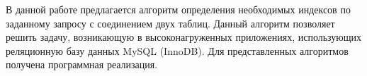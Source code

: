 \Conclusion

В данной работе предлагается алгоритм определения необходимых индексов по заданному запросу с соединением двух таблиц. Данный алгоритм позволяет решить задачу, возникающую в высоконагруженных приложениях, использующих реляционную базу данных MySQL (InnoDB). Для представленных алгоритмов получена программная реализация.